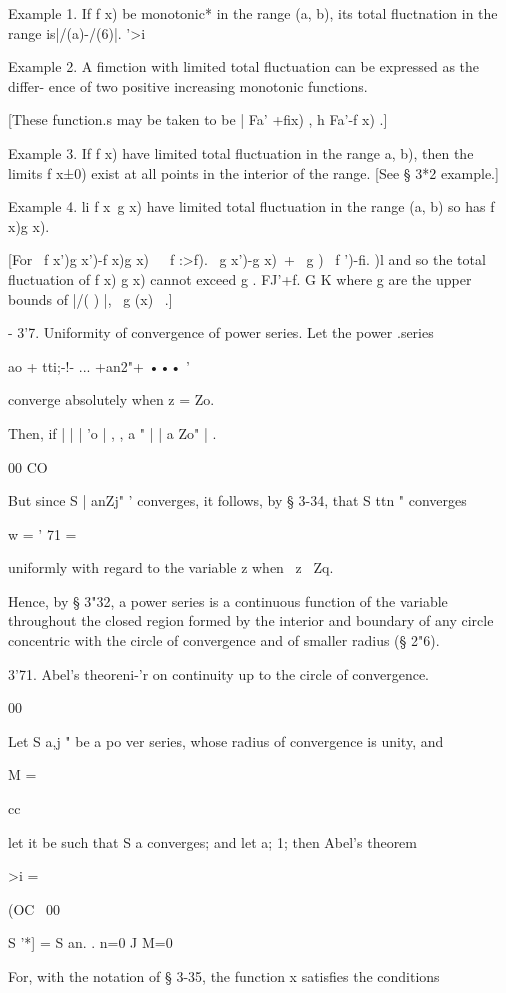 Example 1. If f x) be monotonic* in the range (a, b), its total
fluctnation in the range is|/(a)-/(6)|. '>i

Example 2. A fimction with limited total fluctuation can be expressed
as the differ- ence of two positive increasing monotonic functions.

[These function.s may be taken to be | Fa' +fix) , h Fa'-f x) .]

Example 3. If f x) have limited total fluctuation in the range a, b),
then the limits f x±0) exist at all points in the interior of the
range. [See § 3*2 example.]

Example 4. li f x\ g x) have limited total fluctuation in the range
(a, b) so has f x)g x).

[For \ f x')g x')-f x)g x)\ \ \ f :>f). \ g x')-g x)\ + \ g ) \ f
')-fi. )l and so the total fluctuation of f x) g x) cannot exceed g .
FJ'+f. G K where g are the upper bounds of |/( ) |, \ g (x) \ .]

- 3'7. Uniformity of convergence of power series. Let the power
.series

ao + tti;-!- ... +an2"+ ••• '

converge absolutely when z = Zo.

Then, if | | | 'o | , , a " | | a Zo" | .

00 CO

But since S | anZj" ' converges, it follows, by § 3-34, that S ttn "
converges

w = ' 71 =

uniformly with regard to the variable z when \ z \ Zq.

Hence, by § 3"32, a power series is a continuous function of the
variable throughout the closed region formed by the interior and
boundary of any circle concentric with the circle of convergence and
of smaller radius (§ 2"6).

  3'71. Abel's theoreni-'r on continuity up to the circle of
convergence.

00

Let S a,j " be a po ver series, whose radius of convergence is unity,
and

M =

cc

let it be such that S a converges; and let a; 1; then Abel's theorem

>i =

(OC \ 00

S '*] = S an. . n=0 J M=0

For, with the notation of § 3-35, the function x satisfies the
conditions

